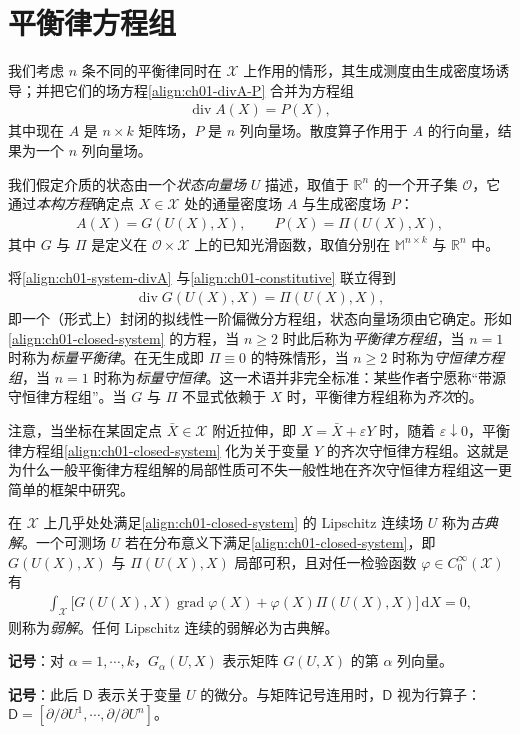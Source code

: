 \documentclass[../../main.tex]{subfiles}
\begin{document}
\section{平衡律方程组}\label{section:ch01-平衡律方程组}

我们考虑 $n$ 条不同的平衡律同时在 $\mathscr{X}$ 上作用的情形，其生成测度由生成密度场诱导；并把它们的场方程\cref{align:ch01-divA-P} 合并为方程组
\begin{align}
\operatorname{div} A(X)=P(X),\label{align:ch01-system-divA}
\end{align}
其中现在 $A$ 是 $n\times k$ 矩阵场，$P$ 是 $n$ 列向量场。散度算子作用于 $A$ 的行向量，结果为一个 $n$ 列向量场。

我们假定介质的状态由一个\emph{状态向量场} $U$ 描述，取值于 $\mathbb{R}^{n}$ 的一个开子集 $\mathcal{O}$，它通过\emph{本构方程}确定点 $X\in\mathscr{X}$ 处的通量密度场 $A$ 与生成密度场 $P$：
\begin{align}
A(X)=G(U(X),X),\qquad P(X)=\Pi(U(X),X),\label{align:ch01-constitutive}
\end{align}
其中 $G$ 与 $\Pi$ 是定义在 $\mathcal{O}\times\mathscr{X}$ 上的已知光滑函数，取值分别在 $\mathbb{M}^{n\times k}$ 与 $\mathbb{R}^{n}$ 中。

将\cref{align:ch01-system-divA} 与\cref{align:ch01-constitutive} 联立得到
\begin{align}
\operatorname{div} G(U(X),X)=\Pi(U(X),X),\label{align:ch01-closed-system}
\end{align}
即一个（形式上）封闭的拟线性一阶偏微分方程组，状态向量场须由它确定。形如\cref{align:ch01-closed-system} 的方程，当 $n\geqslant 2$ 时此后称为\emph{平衡律方程组}，当 $n=1$ 时称为\emph{标量平衡律}。在无生成即 $\Pi\equiv 0$ 的特殊情形，当 $n\geqslant 2$ 时称为\emph{守恒律方程组}，当 $n=1$ 时称为\emph{标量守恒律}。这一术语并非完全标准：某些作者宁愿称“带源守恒律方程组”。当 $G$ 与 $\Pi$ 不显式依赖于 $X$ 时，平衡律方程组称为\emph{齐次}的。

注意，当坐标在某固定点 $\bar{X}\in\mathscr{X}$ 附近拉伸，即 $X=\bar{X}+\varepsilon Y$ 时，随着 $\varepsilon\downarrow 0$，平衡律方程组\cref{align:ch01-closed-system} 化为关于变量 $Y$ 的齐次守恒律方程组。这就是为什么一般平衡律方程组解的局部性质可不失一般性地在齐次守恒律方程组这一更简单的框架中研究。

在 $\mathscr{X}$ 上几乎处处满足\cref{align:ch01-closed-system} 的 Lipschitz 连续场 $U$ 称为\emph{古典解}。一个可测场 $U$ 若在分布意义下满足\cref{align:ch01-closed-system}，即 $G(U(X),X)$ 与 $\Pi(U(X),X)$ 局部可积，且对任一检验函数 $\varphi\in C_{0}^{\infty}(\mathscr{X})$ 有
\begin{align}
\int_{\mathscr{X}}\bigl[G(U(X),X)\operatorname{grad}\varphi(X)+\varphi(X)\Pi(U(X),X)\bigr]\,\mathrm{d}X=0,\label{align:ch01-weak-system}
\end{align}
则称为\emph{弱解}。任何 Lipschitz 连续的弱解必为古典解。

\textbf{记号}：对 $\alpha=1,\cdots,k$，$G_{\alpha}(U,X)$ 表示矩阵 $G(U,X)$ 的第 $\alpha$ 列向量。

\medskip

\textbf{记号}：此后 $\mathsf{D}$ 表示关于变量 $U$ 的微分。与矩阵记号连用时，$\mathsf{D}$ 视为行算子：$\mathsf{D}=[\partial/\partial U^{1},\cdots,\partial/\partial U^{n}]$。
\end{document}
